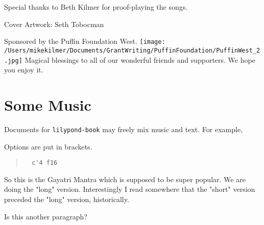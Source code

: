 \documentclass[a5paper,twoside,9pt]{extbook}
\begin{document}
  
  Special thanks to Beth Kilmer for proof-playing the songs.
   \newline
   
   
  Cover Artwork: Seth Tobocman
  \newline
  
  Sponsored by the Puffin Foundation West.
  \texttt{[image: /Users/mikekilmer/Documents/GrantWriting/PuffinFoundation/PuffinWest\_2.jpg]}
  \newline
  \newline
  Magical blessings to all of our wonderful friends and supporters.
  \newline
  \newline
  We hope you enjoy it.

\pagebreak{}

\section{Some Music}

Documents for \verb+lilypond-book+ may freely mix music and text.
For example,

{%
\parindent 0pt
\noindent
\ifx\preLilyPondExample \undefined
\else
  \expandafter\preLilyPondExample
\fi
\def\lilypondbook{}%

\ifx\postLilyPondExample \undefined
\else
  \expandafter\postLilyPondExample
\fi
}

Options are put in brackets.

\begin{quote}
\noindent
\begin{verbatim}
  c'4 f16
\end{verbatim}
{%
\parindent 0pt
\noindent
\ifx\preLilyPondExample \undefined
\else
  \expandafter\preLilyPondExample
\fi
\def\lilypondbook{}%

\ifx\postLilyPondExample \undefined
\else
  \expandafter\postLilyPondExample
\fi
}
\end{quote}

So this is the Gayatri Mantra which is supposed to be super popular. We are doing the "long" version. Interestingly I read somewhere that the "short" version preceded the "long" version, historically.

Is this another paragraph?

\begin{quote}
{%
\parindent 0pt
\noindent
\ifx\preLilyPondExample \undefined
\else
  \expandafter\preLilyPondExample
\fi
\def\lilypondbook{}%

\ifx\postLilyPondExample \undefined
\else
  \expandafter\postLilyPondExample
\fi
}
\end{quote}
\end{document}

